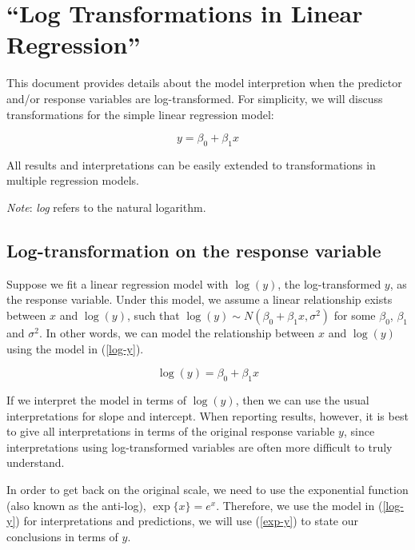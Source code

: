 \documentclass[]{book}
\begin{document}
\chapter{\texorpdfstring{``Log Transformations in Linear
Regression''}{Log Transformations in Linear Regression}}\label{log-transformations-in-linear-regression}

This document provides details about the model interpretion when the
predictor and/or response variables are log-transformed. For simplicity,
we will discuss transformations for the simple linear regression model:

\begin{equation}
\label{orig}
y = \beta_0 + \beta_1 x
\end{equation}

All results and interpretations can be easily extended to
transformations in multiple regression models.

\emph{Note}: \emph{log} refers to the natural logarithm.

\section{Log-transformation on the response
variable}\label{log-transformation-on-the-response-variable}

Suppose we fit a linear regression model with \(\log(y)\), the
log-transformed \(y\), as the response variable. Under this model, we
assume a linear relationship exists between \(x\) and \(\log(y)\), such
that \(\log(y) \sim N(\beta_0 + \beta_1 x, \sigma^2)\) for some
\(\beta_0\), \(\beta_1\) and \(\sigma^2\). In other words, we can model
the relationship between \(x\) and \(\log(y)\) using the model in
(\ref{log-y}).

\begin{equation}
\label{log-y}
\log(y) = \beta_0 + \beta_1 x
\end{equation}

If we interpret the model in terms of \(\log(y)\), then we can use the
usual interpretations for slope and intercept. When reporting results,
however, it is best to give all interpretations in terms of the original
response variable \(y\), since interpretations using log-transformed
variables are often more difficult to truly understand.

In order to get back on the original scale, we need to use the
exponential function (also known as the anti-log), \(\exp\{x\} = e^x\).
Therefore, we use the model in (\ref{log-y}) for interpretations and
predictions, we will use (\ref{exp-y}) to state our conclusions in terms
of \(y\).
\end{document}
